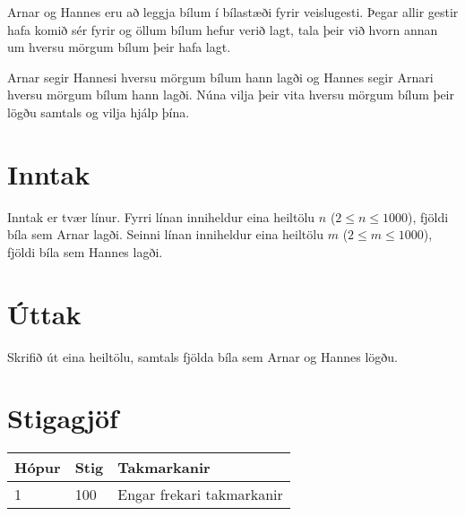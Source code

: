 %
Arnar og Hannes eru að leggja bílum í bílastæði fyrir veislugesti.
Þegar allir gestir hafa komið sér fyrir og öllum bílum hefur verið lagt, 
tala þeir við hvorn annan um hversu mörgum bílum þeir hafa lagt.

Arnar segir Hannesi hversu mörgum bílum hann lagði og Hannes segir Arnari hversu mörgum bílum hann lagði.
Núna vilja þeir vita hversu mörgum bílum þeir lögðu samtals og vilja hjálp þína.

\section*{Inntak}
Inntak er tvær línur.
Fyrri línan inniheldur eina heiltölu $n$ ($2 \leq n \leq 1000$), fjöldi bíla sem Arnar lagði.
Seinni línan inniheldur eina heiltölu $m$ ($2 \leq m \leq 1000$), fjöldi bíla sem Hannes lagði. 

\section*{Úttak}
Skrifið út eina heiltölu, samtals fjölda bíla sem Arnar og Hannes lögðu.

\section*{Stigagjöf}
\begin{tabular}{|l|l|l|}
\hline
Hópur & Stig & Takmarkanir \\ \hline
1     & 100  & Engar frekari takmarkanir\\ \hline
\end{tabular}

